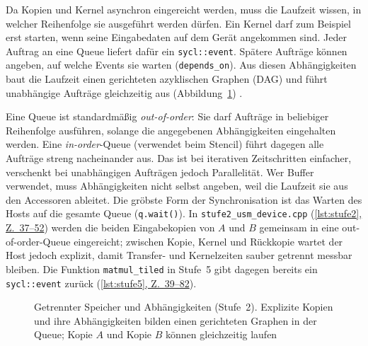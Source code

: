 \documentclass[12pt,a4paper]{article}
\newcommand{\stufenrahmen}[1][alt]{%
    \draw[#1] (0,0) rectangle (5.7,3.3);
    \node[anchor=north, titel, #1, draw=none] at (2.85,3.25) {Host (z.\,B.\ CPU)};
    \draw[#1] (7.2,0) rectangle (14.9,3.3);
    \node[anchor=north east, titel, #1, draw=none] at (14.8,3.25) {Gerät (z.\,B.\ GPU)};
    \node[kasten, #1, minimum width=5.1cm] (prog) at (2.85,2.45) {Hauptprogramm};
    \draw[->, #1] (prog.south) -- (2.85,1.75);
}
\newcommand{\workitems}[1]{%
    \foreach \g in {7.5,10.0} \foreach \i in {0,...,3} \foreach \j in {0,1}
        \draw[#1, fill=white] (\g+\i*0.45,2.0+\j*0.42) rectangle ++(0.36,0.32);
}
\newcommand{\stelle}[2]{(\hyperref[#1]{\ref*{#1}, Z.~#2})}
\begin{document}
Da Kopien und Kernel asynchron eingereicht werden, muss die Laufzeit wissen,
in welcher Reihenfolge sie ausgeführt werden dürfen. Ein Kernel darf zum
Beispiel erst starten, wenn seine Eingabedaten auf dem Gerät angekommen sind.
Jeder Auftrag an eine Queue liefert dafür ein \texttt{sycl::event}. Spätere
Aufträge können angeben, auf welche Events sie warten (\texttt{depends\_on}).
Aus diesen Abhängigkeiten baut die Laufzeit einen gerichteten azyklischen
Graphen (DAG) und führt unabhängige Aufträge gleichzeitig aus
(Abbildung~\ref{fig:stufe2}) \cite{reinders2023dpcpp}.

Eine Queue ist standardmäßig \emph{out-of-order}: Sie darf Aufträge in
beliebiger Reihenfolge ausführen, solange die angegebenen Abhängigkeiten
eingehalten werden. Eine \emph{in-order}-Queue (verwendet beim Stencil) führt
dagegen alle Aufträge streng nacheinander aus. Das ist bei iterativen
Zeitschritten einfacher, verschenkt bei unabhängigen Aufträgen jedoch
Parallelität. Wer Buffer verwendet, muss Abhängigkeiten nicht selbst angeben,
weil die Laufzeit sie aus den Accessoren ableitet. Die gröbste Form der
Synchronisation ist das Warten des Hosts auf die gesamte Queue
(\texttt{q.wait()}). In \texttt{stufe2\_usm\_device.cpp} \stelle{lst:stufe2}{37--52}
werden die beiden Eingabekopien von $A$ und $B$ gemeinsam in eine
out-of-order-Queue eingereicht; zwischen Kopie, Kernel und Rückkopie wartet der
Host jedoch explizit, damit Transfer- und Kernelzeiten sauber getrennt messbar
bleiben. Die Funktion \texttt{matmul\_tiled} in Stufe~5 gibt dagegen bereits ein
\texttt{sycl::event} zurück \stelle{lst:stufe5}{39--82}.

\begin{figure}[htbp]
\centering
{}
\caption[Getrennter Speicher und Abhängigkeiten (Stufe~2)]{Getrennter Speicher und Abhängigkeiten (Stufe~2). Explizite Kopien und ihre Abhängigkeiten bilden einen gerichteten Graphen in der Queue; Kopie $A$ und Kopie $B$ können gleichzeitig laufen}
\label{fig:stufe2}
\end{figure}
\end{document}
